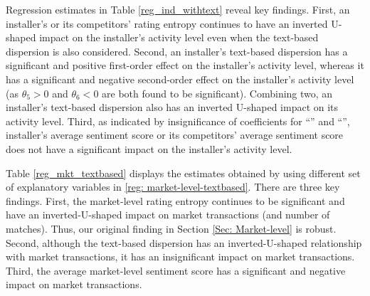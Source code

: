 \documentclass[msom,blindrev]{informs3}
\begin{document}
	

	
	Regression estimates in Table \ref{reg_ind_withtext} reveal key findings. First, an installer's or its competitors' rating entropy continues to have an inverted U-shaped impact on the installer's activity level even when the text-based dispersion is also considered.  Second, an installer's text-based dispersion has a significant and positive first-order effect on the installer's activity level, whereas it has a significant and negative second-order effect on the installer's activity level (as $\theta_{5} > 0$ and $\theta_{6} < 0$ are both found to be significant). Combining two, an installer's text-based dispersion also has an inverted U-shaped impact on its activity level. Third, as indicated by insignificance of coefficients for ``'' and ``'', installer's average sentiment score or its competitors' average sentiment score does not have a significant impact on the installer's activity level.
	
	
	
	Table \ref{reg_mkt_textbased} displays the estimates obtained by using different set of explanatory variables in \eqref{reg: market-level-textbased}. There are three key findings. First, the  market-level rating entropy continues to be significant and have an inverted-U-shaped impact on market transactions (and number of matches). Thus, our original finding in Section \ref{Sec: Market-level} is robust.  Second, although the text-based dispersion has an inverted-U-shaped relationship with market transactions, it has an insignificant impact on market transactions.  Third, the average market-level sentiment score has a significant and negative impact on market transactions.
	
\end{document}
